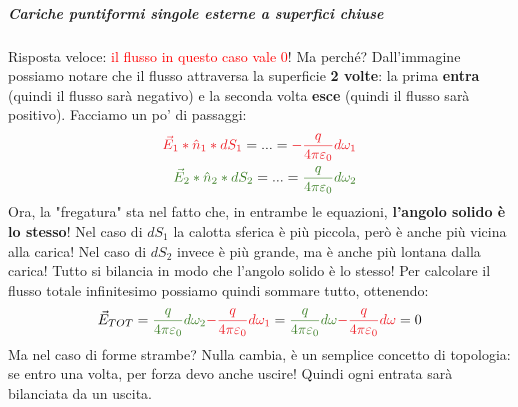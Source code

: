                 \subparagraph{Cariche puntiformi singole esterne a superfici chiuse}
                    Risposta veloce: \textcolor{Red}{il flusso in questo caso vale 0}! Ma perché?
                    Dall'immagine possiamo notare che il flusso attraversa la superficie \textbf{2 volte}: la prima \textbf{entra} (quindi il flusso sarà negativo) e la seconda volta \textbf{esce} (quindi il flusso sarà positivo). Facciamo un po' di passaggi:
                    \begin{align*}
                        \textcolor{Red}{\vec{E}_1*\hat{n}_1*dS_1} = ... = \textcolor{Red}{-\frac{q}{4\pi \varepsilon_0}d\omega_1}\\
                        \textcolor{OliveGreen}{\vec{E}_2*\hat{n}_2*dS_2} = ... = \textcolor{OliveGreen}{\frac{q}{4\pi \varepsilon_0}d\omega_2}
                    \end{align*}
                    Ora, la "fregatura" sta nel fatto che, in entrambe le equazioni, \textbf{l'angolo solido è lo stesso}! Nel caso di $dS_1$ la calotta sferica è più piccola, però è anche più vicina alla carica! Nel caso di $dS_2$ invece è più grande, ma è anche più lontana dalla carica! Tutto si bilancia in modo che l'angolo solido è lo stesso! Per calcolare il flusso totale infinitesimo possiamo quindi sommare tutto, ottenendo:
                    \begin{align*}
                        \vec{E}_{TOT}=\textcolor{OliveGreen}{\frac{q}{4\pi \varepsilon_0}d\omega_2}\textcolor{Red}{-\frac{q}{4\pi \varepsilon_0}d\omega_1}=\textcolor{OliveGreen}{\frac{q}{4\pi \varepsilon_0}d\omega}\textcolor{Red}{-\frac{q}{4\pi \varepsilon_0}d\omega} = 0
                    \end{align*}
                    Ma nel caso di forme strambe?
                    Nulla cambia, è un semplice concetto di topologia: se entro una volta, per forza devo anche uscire! Quindi ogni entrata sarà bilanciata da un uscita.

